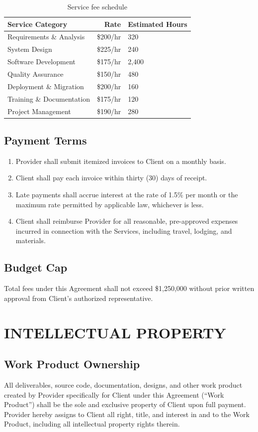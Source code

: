 \documentclass[
    language=english,
    doctype=contract,
    institution=none,
]{../../omnilatex}
\begin{document}
\begin{table}[h]
\centering
\begin{tabular}{lrl}
\toprule
\textbf{Service Category} & \textbf{Rate} & \textbf{Estimated Hours} \\
\midrule
Requirements \& Analysis & \$200/hr & 320 \\
System Design & \$225/hr & 240 \\
Software Development & \$175/hr & 2,400 \\
Quality Assurance & \$150/hr & 480 \\
Deployment \& Migration & \$200/hr & 160 \\
Training \& Documentation & \$175/hr & 120 \\
Project Management & \$190/hr & 280 \\
\bottomrule
\end{tabular}
\caption{Service fee schedule}
\end{table}

\subsection{Payment Terms}
\begin{enumerate}
    \item Provider shall submit itemized invoices to Client on a monthly basis.
    \item Client shall pay each invoice within thirty (30) days of receipt.
    \item Late payments shall accrue interest at the rate of 1.5\% per month or the maximum rate permitted by applicable law, whichever is less.
    \item Client shall reimburse Provider for all reasonable, pre-approved expenses incurred in connection with the Services, including travel, lodging, and materials.
\end{enumerate}

\subsection{Budget Cap}
Total fees under this Agreement shall not exceed \$1,250,000 without prior written approval from Client's authorized representative.

\section{INTELLECTUAL PROPERTY}

\subsection{Work Product Ownership}
All deliverables, source code, documentation, designs, and other work product created by Provider specifically for Client under this Agreement (``Work Product'') shall be the sole and exclusive property of Client upon full payment. Provider hereby assigns to Client all right, title, and interest in and to the Work Product, including all intellectual property rights therein.
\end{document}

